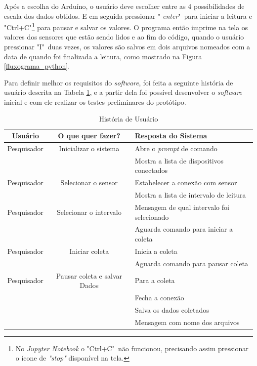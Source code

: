 		Após a escolha do Arduíno, o usuário deve escolher entre as 4 possibilidades de escala dos dados obtidos. E em seguida pressionar " \textit{enter}"\ para iniciar a leitura e "Ctrl+C"\footnote{No \textit{Jupyter Notebook} o "Ctrl+C"\ não funcionou, precisando assim pressionar o ícone de \textit{"stop"} disponível na tela.} para pausar e salvar os valores. O programa então imprime na tela os valores dos sensores que estão sendo lidos e ao fim do código, quando o usuário pressionar "I"\ duas vezes, os valores são salvos em dois arquivos nomeados com a data de quando foi finalizada a leitura, como mostrado na Figura \ref{fluxograma_python}.
		
		Para definir melhor os requisitos do \textit{software}, foi feita a seguinte história de usuário descrita na Tabela \ref{User_story}, e a partir dela foi possível desenvolver o \textit{software} inicial e com ele realizar os testes preliminares do protótipo.
		
			\begin{table}[h] \footnotesize
			\centering
			\caption{História de Usuário}
			\label{User_story}
			
			\begin{tabular}{ccl}
				\toprule
				\textbf{Usuário} & \textbf{O que quer fazer?} & \textbf{Resposta do Sistema} \\
				\midrule
				Pesquisador & Inicializar o sistema &  Abre o \textit{prompt} de comando \\
				 & & Mostra a lista de dispositivos conectados \\
				Pesquisador & Selecionar o sensor & Estabelecer a conexão com sensor \\
				& & Mostra a lista de intervalo de leitura\\
				Pesquisador & Selecionar o intervalo & Mensagem de qual intervalo foi selecionado\\
				& & Aguarda comando para iniciar a coleta\\
				Pesquisador & Iniciar coleta & Inicia a coleta\\
				& &  Aguarda comando para pausar coleta\\
				Pesquisador & Pausar coleta e salvar Dados & Para a coleta\\
				& & Fecha a conexão\\
				& & Salva os dados coletados\\
				& & Mensagem com nome dos arquivos\\  
 				
				\bottomrule
			\end{tabular}
		\end{table}
		
